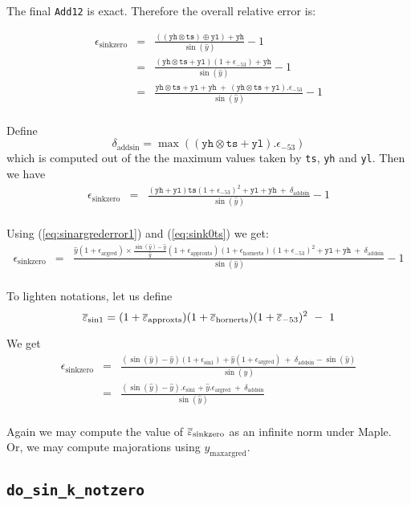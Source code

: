 The final \texttt{Add12} is exact. Therefore the overall relative error is:

\begin{eqnarray*}
  \epsilon_{\mathrm{sinkzero}} 
  &=& \frac{((\mathtt{yh}\otimes \mathtt{ts}) \oplus \mathtt{yl}) + \mathtt{yh}}{\sin(\hat{y})} -1 \\
  &=& \frac{(\mathtt{yh}\otimes\mathtt{ts} + \mathtt{yl})(1+\epsilon_{-53}) + \mathtt{yh}}{\sin(\hat{y})} -1\\
  &=& \frac{\mathtt{yh}\otimes\mathtt{ts} + \mathtt{yl} + \mathtt{yh}    \ +\  (\mathtt{yh}\otimes\mathtt{ts} + \mathtt{yl}).\epsilon_{-53}}{\sin(\hat{y})} -1\\
\end{eqnarray*}

Define 
\begin{equation}
  \delta_{\mathrm{addsin}} = \max((\mathtt{yh}\otimes\mathtt{ts} + \mathtt{yl}).\epsilon_{-53})
\label{eq:addsin}
\end{equation}
which is computed out of the  the maximum values taken by \texttt{ts}, \texttt{yh} and \texttt{yl}. Then we have
\begin{eqnarray*}
  \epsilon_{\mathrm{sinkzero}} 
  &=& \frac{(\mathtt{yh} + \mathtt{yl})\mathtt{ts}(1+\epsilon_{-53})^2 + \mathtt{yl} + \mathtt{yh}    \ +\  \delta_{\mathrm{addsin}} }{\sin(\hat{y})} -1\\
\end{eqnarray*}

Using (\ref{eq:sinargrederror1}) and (\ref{eq:sink0ts}) we get:
\begin{eqnarray*}
  \epsilon_{\mathrm{sinkzero}} 
  &=& \frac{\hat{y}(1+\epsilon_{\mathrm{argred}})\times\frac{\sin(\hat{y})-\hat{y}}{\hat{y}}(1+\epsilon_{\mathrm{approxts}})(1+\epsilon_{\mathrm{hornerts}})(1+\epsilon_{-53})^2 + \mathtt{yl} + \mathtt{yh}    \ +\  \delta_{\mathrm{addsin}} }{\sin(\hat{y})} -1\\
\end{eqnarray*}

To lighten notations, let us define 
\begin{equation}
 {\overline{\varepsilon}}_{\mathrm{sin1}} = (1+{\overline{\varepsilon}}_{\mathrm{approxts}})(1+{\overline{\varepsilon}}_{\mathrm{hornerts}})(1+{\overline{\varepsilon}}_{-53})^2 \ -\ 1
  \label{eq:epssin1}
\end{equation}

We get
\begin{eqnarray*}
  \epsilon_{\mathrm{sinkzero}} 
  &=& \frac{(\sin(\hat{y})-\hat{y})(1+\epsilon_{\mathrm{sin1}}) + \hat{y}(1+\epsilon_{\mathrm{argred}})    \ +\   \delta_{\mathrm{addsin}} - \sin(\hat{y})}{\sin(\hat{y})}\\
  &=& \frac{(\sin(\hat{y})-\hat{y}).\epsilon_{\mathrm{sin1}} + \hat{y}.\epsilon_{\mathrm{argred}}    \ +\ \delta_{\mathrm{addsin}}}{\sin(\hat{y})}\\
\label{eq:sinkzero}
\end{eqnarray*}

Again we may compute the value of ${\overline{\varepsilon}}_{\mathrm{sinkzero}}$ as an infinite norm under Maple. Or, we may compute majorations using $y_{\mathrm{maxargred}}$.

 



\subsection{\texttt{do\_sin\_k\_notzero}}

